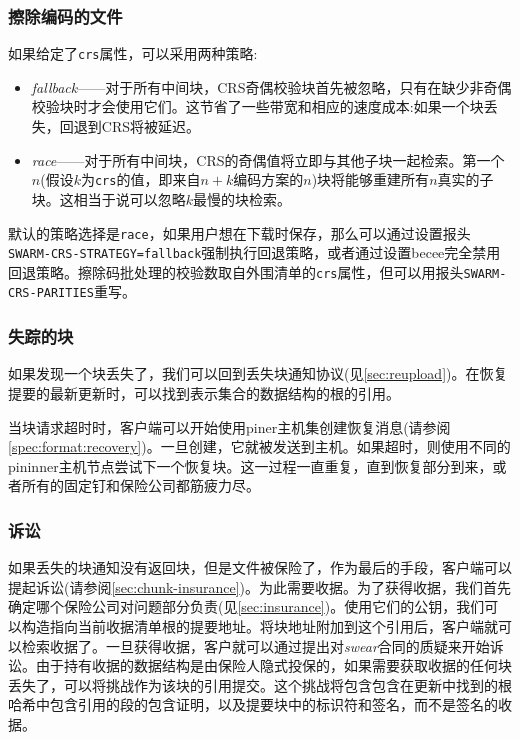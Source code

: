 \subsubsection{擦除编码的文件}

如果给定了\lstinline{crs}属性，可以采用两种策略: 

\begin{itemize}
\item \emph{fallback}——对于所有中间块，CRS奇偶校验块首先被忽略，只有在缺少非奇偶校验块时才会使用它们。这节省了一些带宽和相应的速度成本:如果一个块丢失，回退到CRS将被延迟。
\item \emph{race}——对于所有中间块，CRS的奇偶值将立即与其他子块一起检索。第一个$n$(假设$k$为\lstinline{crs}的值，即来自$n+k$编码方案的$n$)块将能够重建所有$n$真实的子块。这相当于说可以忽略$k$最慢的块检索。  
\end{itemize}

默认的策略选择是\lstinline{race}，如果用户想在下载时保存，那么可以通过设置报头\lstinline{SWARM-CRS-STRATEGY=fallback}强制执行回退策略，或者通过设置becee完全禁用回退策略。擦除码批处理的校验数取自外围清单的\lstinline{crs}属性，但可以用报头\lstinline{SWARM-CRS-PARITIES}重写。

\subsubsection{失踪的块}

如果发现一个块丢失了，我们可以回到丢失块通知协议(见\ref{sec:reupload})。在恢复提要的最新更新时，可以找到表示集合的数据结构的根的引用。

当块请求超时时，客户端可以开始使用piner主机集创建恢复消息(请参阅\ref{spec:format:recovery})。一旦创建，它就被发送到主机。如果超时，则使用不同的pininner主机节点尝试下一个恢复块。这一过程一直重复，直到恢复部分到来，或者所有的固定钉和保险公司都筋疲力尽。

\subsubsection{诉讼}

如果丢失的块通知没有返回块，但是文件被保险了，作为最后的手段，客户端可以提起诉讼(请参阅\ref{sec:chunk-insurance})。为此需要收据。为了获得收据，我们首先确定哪个保险公司对问题部分负责(见\ref{sec:insurance})。使用它们的公钥，我们可以构造指向当前收据清单根的提要地址。将块地址附加到这个引用后，客户端就可以检索收据了。一旦获得收据，客户就可以通过提出对\emph{swear}合同的质疑来开始诉讼。由于持有收据的数据结构是由保险人隐式投保的，如果需要获取收据的任何块丢失了，可以将挑战作为该块的引用提交。这个挑战将包含包含在更新中找到的根哈希中包含引用的段的包含证明，以及提要块中的标识符和签名，而不是签名的收据。 

